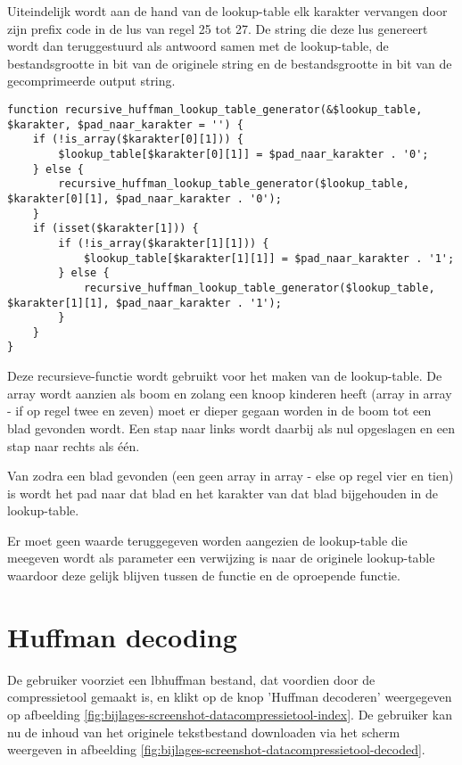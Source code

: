 Uiteindelijk wordt aan de hand van de \gls{lookup-table} elk karakter vervangen door zijn prefix code in de lus van regel 25 tot 27. De \gls{string} die deze lus genereert wordt dan teruggestuurd als antwoord samen met de \gls{lookup-table}, de bestandsgrootte in \gls{bit} van de originele \gls{string} en de bestandsgrootte in \gls{bit} van de gecomprimeerde output \gls{string}.

\begin{lstlisting}
function recursive_huffman_lookup_table_generator(&$lookup_table, $karakter, $pad_naar_karakter = '') {
	if (!is_array($karakter[0][1])) {
		$lookup_table[$karakter[0][1]] = $pad_naar_karakter . '0';
	} else {
		recursive_huffman_lookup_table_generator($lookup_table, $karakter[0][1], $pad_naar_karakter . '0');
	}
	if (isset($karakter[1])) {
		if (!is_array($karakter[1][1])) {
			$lookup_table[$karakter[1][1]] = $pad_naar_karakter . '1';
		} else {
			recursive_huffman_lookup_table_generator($lookup_table, $karakter[1][1], $pad_naar_karakter . '1');
		}
	}
}
\end{lstlisting}

Deze \gls{recursieve-functie} wordt gebruikt voor het maken van de \gls{lookup-table}. De \gls{array} wordt aanzien als boom en zolang een knoop kinderen heeft (array in array - if op regel twee en zeven) moet er dieper gegaan worden in de boom tot een blad gevonden wordt. Een stap naar links wordt daarbij als nul opgeslagen en een stap naar rechts als één. 

Van zodra een blad gevonden (een geen array in array - else op regel vier en tien) is wordt het pad naar dat blad en het karakter van dat blad bijgehouden in de \gls{lookup-table}.

Er moet geen waarde teruggegeven worden aangezien de \gls{lookup-table} die meegeven wordt als parameter een verwijzing is naar de originele \gls{lookup-table} waardoor deze gelijk blijven tussen de functie en de oproepende functie.

\section{Huffman decoding}
\label{sec:compressietool-huffman-decoding}

De gebruiker voorziet een \gls{lbhuffman} bestand, dat voordien door de \gls{compressietool} gemaakt is, en klikt op de knop 'Huffman decoderen' weergegeven op afbeelding \ref{fig:bijlages-screenshot-datacompressietool-index}. De gebruiker kan nu de inhoud van het originele tekstbestand downloaden via het scherm weergeven in afbeelding \ref{fig:bijlages-screenshot-datacompressietool-decoded}.


